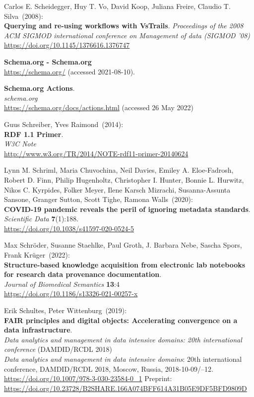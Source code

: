\begin{thebibliography}{9}
 Carlos E. Scheidegger, Huy T. Vo, David Koop, Juliana Freire, Claudio T. Silva~(2008): \\
\textbf{Querying and re-using workflows with VsTrails}.
\emph{Proceedings of the 2008 ACM SIGMOD international conference on Management of data (SIGMOD '08)}\\
\url{https://doi.org/10.1145/1376616.1376747}

\textbf{Schema.org - Schema.org}\\
\url{https://schema.org/} (accessed 2021-08-10).

\textbf{Schema.org {Actions}}.\\
\emph{schema.org}\\
\url{https://schema.org/docs/actions.html} (accessed 26 May 2022)

Guus Schreiber, Yves Raimond~(2014): \\
\textbf{RDF 1.1 Primer}. \\
\emph{W3C Note} \\
\url{http://www.w3.org/TR/2014/NOTE-rdf11-primer-20140624}

Lynn M. Schriml, Maria Chuvochina, Neil Davies, Emiley A.
Eloe-Fadrosh, Robert D. Finn, Philip Hugenholtz, Christopher I. Hunter,
Bonnie L. Hurwitz, Nikos C. Kyrpides, Folker Meyer, Ilene Karsch
Mizrachi, Susanna-Assunta Sansone, Granger Sutton, Scott Tighe, Ramona
Walls~(2020): \\
\textbf{COVID-19 pandemic reveals the peril of ignoring metadata
standards}.\\
\emph{Scientific Data} \textbf{7}(1):188.\\
\url{https://doi.org/10.1038/s41597-020-0524-5}

 Max Schröder, Susanne Staehlke, Paul Groth, J.
 Barbara Nebe, Sascha Spors, Frank Krüger~(2022): \\
\textbf{Structure-based knowledge acquisition from electronic lab
notebooks for research data provenance documentation}.\\
\emph{Journal of Biomedical Semantics} \textbf{13}:4\\
\url{https://doi.org/10.1186/s13326-021-00257-x}

Erik Schultes, Peter Wittenburg~(2019): \\
\textbf{FAIR principles and digital objects: Accelerating convergence on a data infrastructure}.\\
\emph{Data analytics and management in data intensive domains: 20th
international conference} (DAMDID/RCDL 2018)\\
\emph{Data analytics and management in data intensive domains}: 20th international conference,
{DAMDID}/{RCDL} 2018, Moscow, Russia, 2018-10-09/--12. \\
\url{https://doi.org/10.1007/978-3-030-23584-0_1}
Preprint: \url{https://doi.org/10.23728/B2SHARE.166A074BFF614A31B05E9DF5BFD9809D}


\end{thebibliography}
